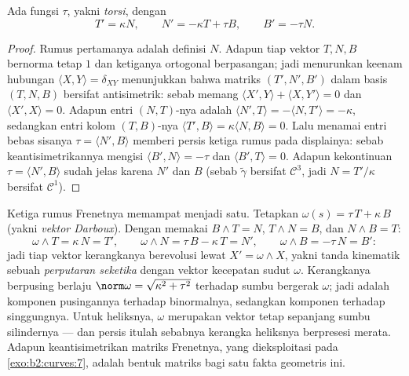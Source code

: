\begin{theorem}\label{thm:b2:curves:frenet3d}
Ada fungsi  $\tau$, yakni \emph{torsi}, dengan
\[
T' = \kappa N, \qquad
N' = -\kappa T + \tau B, \qquad
B' = -\tau N .
\]
\end{theorem}

\begin{proof}
Rumus pertamanya adalah definisi $N$. Adapun tiap vektor
$T, N, B$ bernorma tetap $1$ dan ketiganya ortogonal berpasangan;
jadi menurunkan keenam hubungan $\langle X, Y\rangle = \delta_{XY}$
menunjukkan bahwa matriks $(T', N', B')$ dalam basis $(T, N, B)$ bersifat
antisimetrik: sebab memang $\langle X', Y\rangle + \langle X, Y'\rangle = 0$ dan
$\langle X', X\rangle = 0$. Adapun entri $(N, T)$-nya adalah $\langle N', T\rangle =
-\langle N, T'\rangle = -\kappa$, sedangkan entri kolom $(T, B)$-nya
$\langle T', B\rangle = \kappa\langle N, B\rangle = 0$. Lalu menamai entri
bebas sisanya $\tau = \langle N', B\rangle$ memberi persis ketiga rumus pada
displainya: sebab keantisimetrikannya mengisi $\langle B', N\rangle = -\tau$ dan
$\langle B', T\rangle = 0$. Adapun kekontinuan $\tau = \langle N', B\rangle$ sudah jelas
karena $N'$ dan $B$  (sebab $\tilde\gamma$ bersifat
$\mathcal{C}^3$, jadi $N = T'/\kappa$ bersifat $\mathcal{C}^1$).
\end{proof}

\begin{example}\label{ex:b2:curves:darboux}
Ketiga rumus Frenetnya memampat menjadi satu. Tetapkan $\omega(s) =
\tau\,T + \kappa\,B$ (yakni \emph{vektor Darboux}). Dengan memakai $B
\wedge T = N$, $T \wedge N = B$, dan $N \wedge B = T$:
\[
\omega \wedge T = \kappa\,N = T', \qquad
\omega \wedge N = \tau\,B - \kappa\,T = N', \qquad
\omega \wedge B = -\tau\,N = B' :
\]
jadi tiap vektor kerangkanya berevolusi lewat $X' = \omega \wedge X$, yakni
tanda kinematik sebuah \emph{perputaran seketika} dengan
vektor kecepatan sudut $\omega$. Kerangkanya berpusing berlaju
$\norm\omega = \sqrt{\kappa^2 + \tau^2}$ terhadap sumbu bergerak
$\omega$; jadi  adalah komponen pusingannya terhadap
binormalnya, sedangkan  komponen terhadap singgungnya. Untuk
heliksnya, $\omega$ merupakan vektor tetap sepanjang sumbu
silindernya --- dan persis itulah sebabnya kerangka heliksnya berpresesi
merata. Adapun keantisimetrikan matriks Frenetnya, yang dieksploitasi pada
\cref{exo:b2:curves:7}, adalah bentuk matriks bagi satu
fakta geometris ini.
\end{example}

